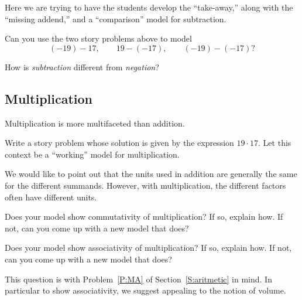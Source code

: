 \begin{teachingnote}
Here we are trying to have the students develop the ``take-away,''
along with the ``missing addend,'' and a ``comparison'' model for
subtraction.
\end{teachingnote}


\begin{question}
Can you use the two story problems above to model
\[
(-19)-17, \qquad  19 - (-17), \qquad (-19) - (-17)?
\]
\end{question}
\QM

\begin{question}
How is \emph{subtraction} different from \emph{negation}?  
\end{question}
\QM

\subsection{Multiplication}
Multiplication is more multifaceted than addition. 

\begin{question}
Write a story problem whose solution is given by the expression
$19\cdot 17$. Let this context be a ``working'' model for multiplication. 
\end{question}
\QM

\begin{teachingnote}
We would like to point out that the units used in addition are generally
the same for the different summands. However, with multiplication, the
different factors often have different units.
\end{teachingnote}

\begin{question}
Does your model show commutativity of multiplication? If so, explain
how. If not, can you come up with a new model that does?
\end{question}
\QM

\begin{question}
Does your model show associativity of multiplication? If so, explain
how. If not, can you come up with a new model that does?
\end{question}
\QM

\begin{teachingnote}
This question is with Problem~\ref{P:MA} of
Section~\ref{S:aritmetic} in mind. In particular to show
associativity, we suggest appealing to the notion of volume.
\end{teachingnote}


